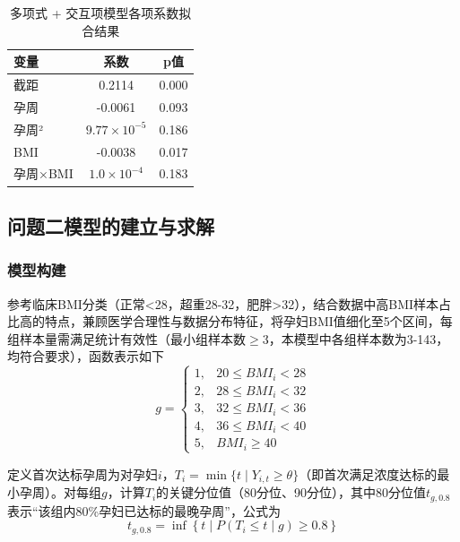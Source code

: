 \documentclass[withoutpreface,bwprint]{cumcmthesis} %
\begin{document}
\begin{table}[H]
    \centering  %
    \caption{多项式 + 交互项模型各项系数拟合结果}  %
    \label{tab:多项式 + 交互项模型各项系数拟合结果}  %
    \begin{threeparttable}
        \begin{tabularx}{0.4\textwidth}{l c c }
            \toprule[1.5pt]
            \textbf{变量} & \textbf{系数} & \textbf{p值}\\ 
            \midrule[1pt]
            截距 & 0.2114 & 0.000  \\
            孕周 & -0.0061 & 0.093  \\
            孕周² & $9.77 \times 10^{-5}$ & 0.186  \\
            BMI & -0.0038 & 0.017  \\
            孕周×BMI & $1.0 \times 10^{-4}$ & 0.183  \\

            \bottomrule[1.5pt]
        \end{tabularx}
    \end{threeparttable}
\end{table}


\subsection{问题二模型的建立与求解}


\subsubsection{模型构建} 
参考临床BMI分类（正常<28，超重28-32，肥胖>32），结合数据中高BMI样本占比高的特点，兼顾医学合理性与数据分布特征，将孕妇BMI值细化至5个区间，每组样本量需满足统计有效性（最小组样本数$\ge$3，本模型中各组样本数为3-143，均符合要求），函数表示如下
\begin{equation}
    g = \begin{cases} 
1, & 20 \leq BMI_i < 28 \\
2, & 28 \leq BMI_i < 32 \\
3, & 32 \leq BMI_i < 36 \\
4, & 36 \leq BMI_i < 40 \\
5, & BMI_i \geq 40 
\end{cases}
\end{equation}

定义首次达标孕周为对孕妇$i$，$T_i = \min\{t \mid Y_{i,t}≥\theta\}$（即首次满足浓度达标的最小孕周）。对每组$g$，计算$T_i$的关键分位值（80分位、90分位），其中80分位值$t_{g,0.8}$表示“该组内80\%孕妇已达标的最晚孕周”，公式为
\begin{equation}
    t_{g,0.8} = \inf\left\{ t \mid P(T_i \leq t \mid g) \geq 0.8 \right\}
\end{equation}
\end{document}
